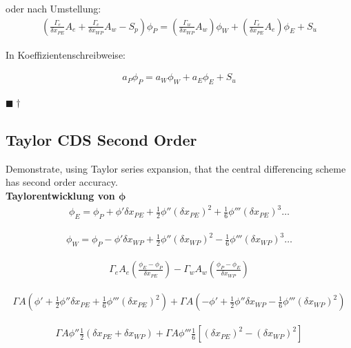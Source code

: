\documentclass[a4paper]{scrartcl}
\newcommand{\qed}{\begin{flushright}
$\blacksquare \dagger$ \end{flushright}}
\begin{document}
oder nach Umstellung:
\begin{align}
\boxed{\left(\frac{\Gamma_e}{\delta x_{PE}}A_e + \frac{\Gamma_e}{\delta
x_{WP}} A_w -S_p\right)\phi_P=\left(\frac{\Gamma_w}{\delta x_{WP}}A_w\right)
\phi_W + \left(\frac{\Gamma_e}{\delta x_{PE}}A_e\right)\phi_E+S_u}
\end{align}

In Koeffizientenschreibweise:

\begin{align}
\boxed{a_P\phi_P=a_W\phi_W+a_E\phi_E+S_u}
\end{align}

\qed
\subsection{Taylor CDS Second Order}
Demonstrate, using Taylor series expansion, that the central differencing scheme
has second order accuracy.\\
\textbf{Taylorentwicklung von $\mathbf{\phi}$} \\

\begin{align}
\boxed{\phi_E=\phi_P+\phi'\delta x_{PE} + \frac{1}{2}\phi''\left(\delta
x_{PE}\right)^2+\frac{1}{6}\phi'''\left(\delta x_{PE}\right)^3\ldots}
\end{align}

\begin{align}
\boxed{\phi_W=\phi_P-\phi'\delta x_{WP} + \frac{1}{2}\phi''\left(\delta
x_{WP}\right)^2-\frac{1}{6}\phi'''\left(\delta x_{WP}\right)^3\ldots}
\end{align}

\begin{align}
\Gamma_e A_e \left(\frac{\phi_E-\phi_P}{\delta x_{PE}}\right)-\Gamma_w A_w
\left(\frac{\phi_P-\phi_E}{\delta x_{WP}}\right)
\end{align}

\begin{align}
\Gamma A \left(\phi' + \frac{1}{2} \phi''\delta
x_{PE}+\frac{1}{6}\phi'''\left(\delta x_{PE}\right)^2\right) + \Gamma A
\left(-\phi'+\frac{1}{2}\phi''\delta x_{WP} - \frac{1}{6} \phi'''
\left(\delta x_{WP}\right)^2\right)
\end{align}

\begin{align}
\boxed{\Gamma A \phi'' \frac{1}{2} \left(\delta x_{PE} + \delta x_{WP}\right)+
\Gamma A \phi''' \frac{1}{6}
\left[\left(\delta x_{PE}\right)^2 - \left(\delta x_{WP}\right)^2 \right]}
\end{align}
\end{document}
